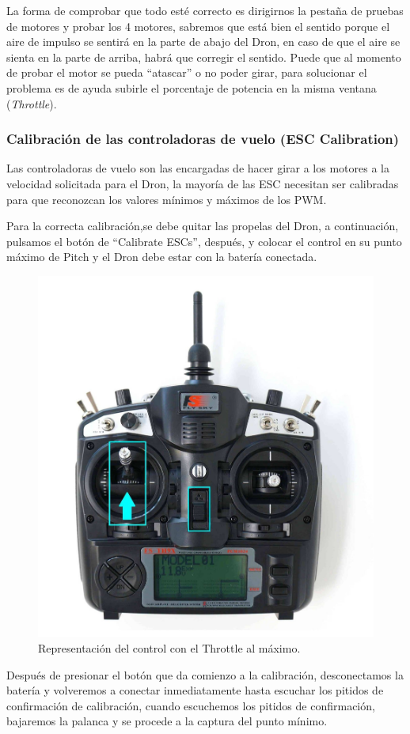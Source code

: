 La forma de comprobar que todo esté correcto es dirigirnos la pestaña de pruebas de motores y probar los 4 motores, sabremos que está bien el sentido porque el aire de impulso se sentirá en la parte de abajo del Dron, en caso de que el aire se sienta en la parte de arriba, habrá que corregir el sentido. Puede que al momento de probar el motor se pueda “atascar” o no poder girar, para solucionar el problema es de ayuda subirle el porcentaje de potencia en la misma ventana (\textit{Throttle}).

\subsubsection{Calibración de las controladoras de vuelo (ESC Calibration)}

Las controladoras de vuelo son las encargadas de hacer girar a los motores a la velocidad solicitada para el Dron, la mayoría de las ESC necesitan ser calibradas para que reconozcan los valores mínimos y máximos de los PWM.

Para la correcta calibración,se debe quitar las propelas del Dron, a continuación, pulsamos el botón de “Calibrate ESCs”, después, y colocar el control en su punto máximo de Pitch y el Dron debe estar con la batería conectada.

\begin{figure}[H]
	\centering
	\includegraphics[width=0.5\linewidth]{imagenes/ctr1}
	\caption{Representación del control con el Throttle al máximo.}
	\label{fig:ctr1}
\end{figure}

Después de presionar el botón que da comienzo a la calibración, desconectamos la batería y volveremos a conectar inmediatamente hasta escuchar los pitidos de confirmación de calibración, cuando escuchemos los pitidos de confirmación, bajaremos la palanca y se procede a la captura del punto mínimo.

